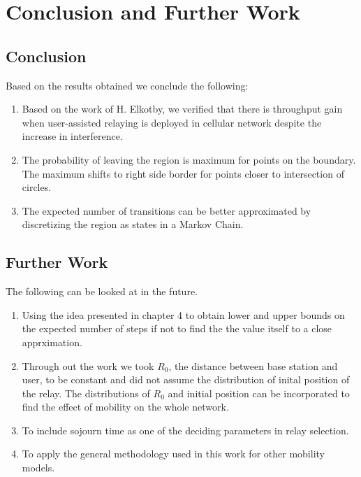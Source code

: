 \chapter{Conclusion and Further Work}
\section{Conclusion}
Based on the results obtained we conclude the following:
\begin{enumerate}
\item Based on the work of H. Elkotby, we verified that there is throughput gain when user-assisted relaying is deployed in cellular network despite the increase in interference. 
\item The probability of leaving the region is maximum for points on the boundary. The maximum shifts to right side border for points closer to intersection of circles.
\item The expected number of transitions can be better approximated by discretizing the region as states in a Markov Chain.
\end{enumerate}

\section{Further Work}
The following can be looked at in the future.
\begin{enumerate}
\item	Using the idea presented in chapter 4 to obtain lower and upper bounds on the expected number of steps if not to find the the value itself to a close apprximation.
\item	Through out the work we took $R_0$, the distance between base station and user, to be constant and did not assume the distribution of inital position of the relay. The distributions of $R_0$ and initial position can be incorporated to find the effect of mobility on the whole network.
\item	To include sojourn time as one of the deciding parameters in relay selection.     
\item	To apply the general methodology used in this work for other mobility models. 
\end{enumerate}
